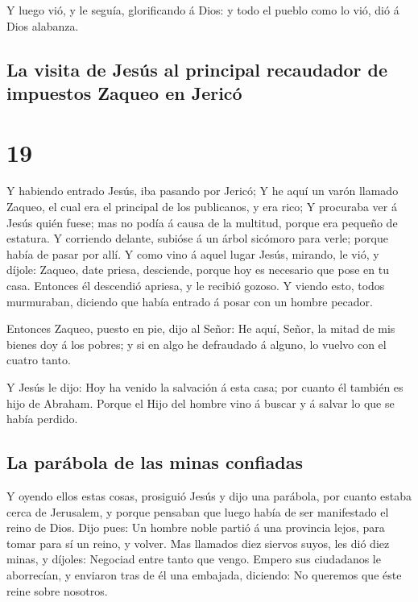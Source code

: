  Y luego vió, y le seguía, glorificando á Dios: y todo el
pueblo como lo vió, dió á Dios alabanza.

\hypertarget{la-visita-de-jesuxfas-al-principal-recaudador-de-impuestos-zaqueo-en-jericuxf3}{%
\subsection{La visita de Jesús al principal recaudador de impuestos
Zaqueo en
Jericó}\label{la-visita-de-jesuxfas-al-principal-recaudador-de-impuestos-zaqueo-en-jericuxf3}}

\hypertarget{section-42-19}{%
\section{19}\label{section-42-19}}

 Y habiendo entrado Jesús, iba pasando por Jericó;
 Y he aquí un varón llamado Zaqueo, el cual era el
principal de los publicanos, y era rico;  Y procuraba ver
á Jesús quién fuese; mas no podía á causa de la multitud, porque era
pequeño de estatura.  Y corriendo delante, subióse á un
árbol sicómoro para verle; porque había de pasar por allí.
 Y como vino á aquel lugar Jesús, mirando, le vió, y
díjole: Zaqueo, date priesa, desciende, porque hoy es necesario que pose
en tu casa.  Entonces él descendió apriesa, y le recibió
gozoso.  Y viendo esto, todos murmuraban, diciendo que
había entrado á posar con un hombre pecador.

 Entonces Zaqueo, puesto en pie, dijo al Señor: He aquí,
Señor, la mitad de mis bienes doy á los pobres; y si en algo he
defraudado á alguno, lo vuelvo con el cuatro tanto.

 Y Jesús le dijo: Hoy ha venido la salvación á esta casa;
por cuanto él también es hijo de Abraham.  Porque el Hijo
del hombre vino á buscar y á salvar lo que se había perdido.

\hypertarget{la-paruxe1bola-de-las-minas-confiadas}{%
\subsection{La parábola de las minas
confiadas}\label{la-paruxe1bola-de-las-minas-confiadas}}

 Y oyendo ellos estas cosas, prosiguió Jesús y dijo una
parábola, por cuanto estaba cerca de Jerusalem, y porque pensaban que
luego había de ser manifestado el reino de Dios.  Dijo
pues: Un hombre noble partió á una provincia lejos, para tomar para sí
un reino, y volver.  Mas llamados diez siervos suyos, les
dió diez minas, y díjoles: Negociad entre tanto que vengo.
 Empero sus ciudadanos le aborrecían, y enviaron tras de
él una embajada, diciendo: No queremos que éste reine sobre nosotros.

